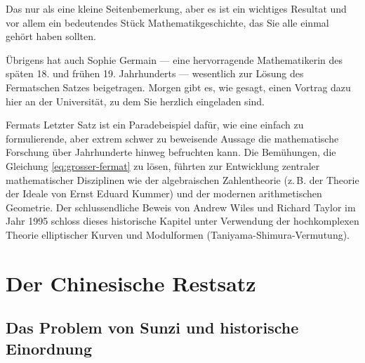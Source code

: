 \begin{spoken-clean}[00:57:02 - 00:58:11]
Das nur als eine kleine Seitenbemerkung, aber es ist ein wichtiges Resultat und vor allem ein bedeutendes Stück Mathematikgeschichte, das Sie alle einmal gehört haben sollten.

Übrigens hat auch Sophie Germain --- eine hervorragende Mathematikerin des späten 18. und frühen 19. Jahrhunderts --- wesentlich zur Lösung des Fermatschen Satzes beigetragen. Morgen gibt es, wie gesagt, einen Vortrag dazu hier an der Universität, zu dem Sie herzlich eingeladen sind.
\end{spoken-clean}

\begin{math-stroke}
\end{math-stroke}

\begin{didactic-insight}
Fermats Letzter Satz ist ein Paradebeispiel dafür, wie eine einfach zu formulierende, aber extrem schwer zu beweisende Aussage die mathematische Forschung über Jahrhunderte hinweg befruchten kann. Die Bemühungen, die Gleichung \eqref{eq:grosser-fermat} zu lösen, führten zur Entwicklung zentraler mathematischer Disziplinen wie der algebraischen Zahlentheorie (z.\,B. der Theorie der Ideale von Ernst Eduard Kummer) und der modernen arithmetischen Geometrie. Der schlussendliche Beweis von Andrew Wiles und Richard Taylor im Jahr 1995 schloss dieses historische Kapitel unter Verwendung der hochkomplexen Theorie elliptischer Kurven und Modulformen (Taniyama-Shimura-Vermutung).
\end{didactic-insight}

\section{Der Chinesische Restsatz}

\subsection{Das Problem von Sunzi und historische Einordnung}

